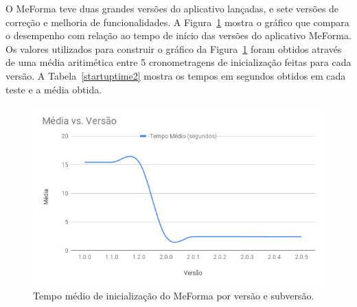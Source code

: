 O MeForma teve duas grandes versões do aplicativo lançadas, e sete versões de correção e melhoria de funcionalidades. A Figura~\ref{startuptime} mostra o gráfico que compara o desempenho com relação ao tempo de início das versões do aplicativo MeForma. Os valores utilizados para construir o gráfico da Figura~\ref{startuptime} foram obtidos através de uma média aritimética entre 5 cronometragens de inicialização feitas para cada versão. A Tabela~\ref{startuptime2} mostra os tempos em segundos obtidos em cada teste e a média obtida.

\begin{figure}[H]
	   \centering
	   		\includegraphics[scale=0.65]{pics/c5/9-startuptime.png}
	   \caption{Tempo médio de inicialização do MeForma por versão e subversão.}
	   \label{startuptime}
\end{figure}


